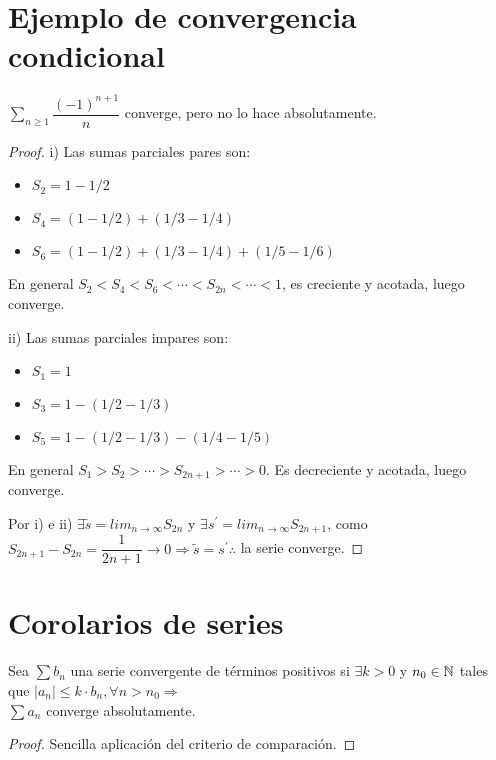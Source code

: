 \section{Ejemplo de convergencia condicional}

\begin{eg}
  $\sum_{n \geq 1} \dfrac{(-1)^{n+1}}{n}$ converge, pero no lo hace absolutamente.
  \begin{proof}
    i) Las sumas parciales pares son: 

    \begin{itemize}
      \item $S_2 = 1 - 1/2$
      \item $S_4 = (1 - 1/2) + (1/3 - 1/4)$
      \item $S_6 = (1 - 1/2) + (1/3 - 1/4) + (1/5 - 1/6)$
    \end{itemize}

    En general $S_2 < S_4 < S_6 < \cdots < S_{2n} < \cdots < 1$, es creciente y acotada, luego converge.

    ii) Las sumas parciales impares son:

    \begin{itemize}
      \item $S_1 = 1$
      \item $S_3 = 1 - (1/2 - 1/3)$
      \item $S_5 = 1 - (1/2 - 1/3) - (1/4 - 1/5)$
    \end{itemize}

    En general $S_1 > S_2 > \cdots > S_{2n+1} > \cdots > 0$. Es decreciente y acotada, luego converge.

    Por i) e ii) $\exists \tilde{s} = lim_{n \to \infty} S_{2n}$ y $\exists s^{\prime} = lim_{n \to \infty} S_{2n+1}$, como $S_{2n+1} - S_{2n} = \dfrac{1}{2n+1} \to 0 \Rightarrow \tilde{s} = s^{\prime} \therefore$ la serie converge.
  \end{proof}
\end{eg}

\section{Corolarios de series}

\begin{corollary}
  Sea $\sum b_n$ una serie convergente de términos positivos si $\exists k > 0$ y $n_0 \in \mathbb{N}$ tales que $|a_n| \leq k \cdot b_n, \forall n > n_0 \Rightarrow$ \\
  $\sum a_n$ converge absolutamente.

  \begin{proof}
    Sencilla aplicación del criterio de comparación.
  \end{proof}
\end{corollary}

